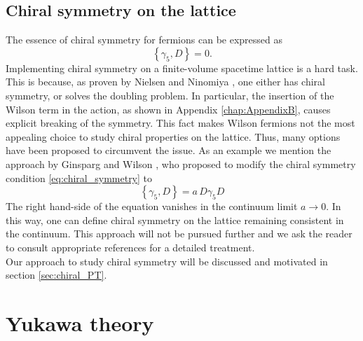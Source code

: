 \subsection{Chiral symmetry on the lattice}
The essence of chiral symmetry for fermions can be expressed as \cite{gattringer_LQCD}
\begin{equation}
    \left\{\gamma_5, D \right\} = 0.
    \label{eq:chiral_symmetry}
\end{equation}
Implementing chiral symmetry on a finite-volume spacetime lattice is a hard task. This is because, as proven by Nielsen and Ninomiya \cite{NIELSEN198120}, one either has chiral symmetry, or solves the doubling problem.
In particular, the insertion of the Wilson term in the action, as shown in Appendix \ref{chap:AppendixB}, causes explicit breaking of the symmetry. This fact makes Wilson fermions not the most appealing choice to study chiral properties on the lattice. 
Thus, many options have been proposed to circumvent the issue. As an example we mention the approach by Ginsparg and Wilson \cite{ginsparg}, who proposed to modify the chiral symmetry condition \eqref{eq:chiral_symmetry} to 
\begin{equation*}
    \left\{\gamma_5, D \right\} = a \, D \gamma_5 D
\end{equation*}
The right hand-side of the equation vanishes in the continuum limit $a \to 0$. In this way, one can define chiral symmetry on the lattice remaining consistent in the continuum. This approach will not be pursued further and we ask the reader to consult 
appropriate references \cite{rothe_LGT,gattringer_LQCD} for a detailed treatment. \\
Our approach to study chiral symmetry will be discussed and motivated in section \ref{sec:chiral_PT}.
\section{Yukawa theory}
\label{sec:Yukawa_theory}
